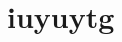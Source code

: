 \documentclass[a4paper]{article}
\begin{document}

\tableofcontents
\thispagestyle{empty} %
\newpage

\section{iuyuytg}
\end{document}
